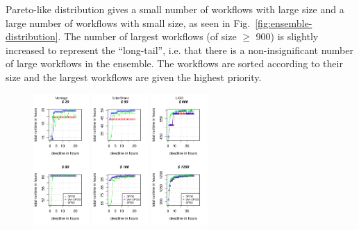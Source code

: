 \documentclass{sig-alternate}
\begin{document}
Pareto-like distribution gives a small number of workflows with large size and a
large number of workflows with small size, as seen in
Fig.~\ref{fig:ensemble-distribution}. The number of largest
workflows (of size $\geq$ 900) is slightly increased to represent the
``long-tail'', i.e. that there is a non-insignificant number of large workflows
in the ensemble. The workflows are sorted according to their size and the largest workflows are
given the highest priority. 




\begin{figure}[t]  
\centering
\includegraphics[width=0.19\textwidth]{figures/pareto-size-MONTAGE-n-1000-8-dagh1-20m0.pdf}
\includegraphics[width=0.19\textwidth]{figures/pareto-size-CYBERSHAKE-n-1000-8-dagh1-20m0.pdf}
\includegraphics[width=0.19\textwidth]{figures/pareto-size-LIGO-n-1000-8-dagh1-40m0.pdf}

\end{figure}
\end{document}
